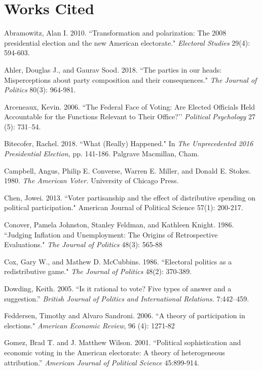 \documentclass[12pt]{paper}
\begin{document}
\clearpage

\section*{Works Cited}
\singlespace 
\begin{hangparas}{.25in}{1}

Abramowitz, Alan I. 2010. ``Transformation and polarization: The 2008 presidential election and the new American electorate." \textit{Electoral Studies} 29(4): 594-603.

Ahler, Douglas J., and Gaurav Sood. 2018. ``The parties in our heads: Misperceptions about party composition and their consequences." \textit{The Journal of Politics} 80(3): 964-981.

Arceneaux, Kevin. 2006. ``The Federal Face of Voting: Are Elected Officials Held Accountable for the Functions Relevant to Their Office?’’ \textit{Political Psychology} 27 (5): 731–54.

Bitecofer, Rachel. 2018. ``What (Really) Happened." In \textit{The Unprecedented 2016 Presidential Election,} pp. 141-186. Palgrave Macmillan, Cham.

Campbell, Angus, Philip E. Converse, Warren E. Miller, and Donald E. Stokes. 1980. \textit{The American Voter.} University of Chicago Press.

Chen, Jowei. 2013. ``Voter partisanship and the effect of distributive spending on political participation." American Journal of Political Science 57(1): 200-217.

Conover, Pamela Johnston, Stanley Feldman, and Kathleen Knight. 1986. ``Judging Inflation and Unemployment: The Origins of Retrospective Evaluations." \textit{The Journal of Politics} 48(3): 565-88

Cox, Gary W., and Mathew D. McCubbins. 1986. ``Electoral politics as a redistributive game." \textit{The Journal of Politics} 48(2): 370-389.

Dowding, Keith. 2005. ``Is it rational to vote? Five types of answer and a suggestion.” \textit{British Journal of Politics and International Relations.} 7:442–459.

Feddersen, Timothy and Alvaro Sandroni. 2006. ``A theory of participation in elections." \textit{American Economic Review}, 96 (4): 1271-82

Gomez, Brad T. and J. Matthew Wilson. 2001. ``Political sophistication and economic voting in the American electorate: A theory of heterogeneous attribution.” \textit{American Journal of Political Science} 45:899-914.


\end{hangparas}
\end{document}
